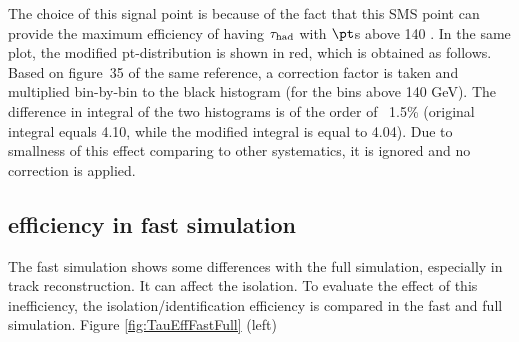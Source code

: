  The choice of this signal point is because of the fact that this SMS point can provide the maximum efficiency of 
having $\tau_{\rm had}$ with $\pt$s above 140 \GeV.  In the same plot, the modified pt-distribution is shown in red, 
which is obtained as follows. Based on figure~35 of the same reference, a correction factor is taken and 
multiplied bin-by-bin to the black histogram (for the bins above 140 GeV). The difference in integral
of the two histograms is of the order of ~1.5\% (original integral equals 4.10, while the modified integral is equal to 4.04).
Due to smallness of this effect comparing to other systematics, it is ignored and no correction is applied. 


\subsection{\texorpdfstring{\Tau efficiency in fast simulation}{Tau efficiency in fast simulation}}
The fast simulation shows some differences with the full simulation, especially in track reconstruction. It can affect the \Tau isolation.
To evaluate the effect of this inefficiency, the \Tau isolation/identification efficiency  is compared in the fast and full simulation.
Figure \ref{fig:TauEffFastFull} (left)
